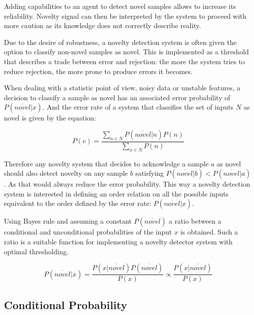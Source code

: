 \documentclass[runningheads,a4paper]{llncs}
\begin{document}
Adding capabilities to an agent to detect novel samples allows to increase its
reliability. Novelty signal can then be interpreted by the system to proceed
with more caution as its knowledge does not correctly describe reality.

Due to the desire of robustness, a novelty detection system is often given the option
to classify non-novel samples as novel. This is implemented as a threshold that describes a trade
between error and rejection: the more the system tries to reduce rejection, the more
prone to produce errors it becomes.

When dealing with a statistic point of view, noisy data or unstable features, a decision to
classify a sample as novel has an associated error probability of $P(\overline{novel}|x)$.
And the error rate of a system that classifies the set of inputs $N$ as novel is given by
the equation:

\begin{equation}
P(e) = \frac{\sum_{n \in N}{P(\overline{novel}|n)P(n)}}{\sum_{n \in N}{P(n)}}
\end{equation}

Therefore any novelty system that decides to acknowledge a sample
$a$ as novel should also detect novelty on any sample $b$ satisfying
$P(\overline{novel}|b) < P(\overline{novel}|a)$.
As that would always reduce the error probability.
This way a novelty detection system is interested in defining an
order relation on all the possible inputs equivalent to the order defined by
the error rate: $P(\overline{novel}|x)$.

Using Bayes rule and assuming a constant $P(\overline{novel})$
a ratio between a conditional and unconditional probabilities of the input $x$ is obtained.
Such a ratio is a suitable function for implementing a novelty detector system with optimal
thresholding.

\begin{equation}
\label{eq:novelty-threshold}
          P(\overline{novel}|x)
  =       \frac{P(x|\overline{novel}) P(\overline{novel})}{P(x)}
  \propto \frac{P(x|\overline{novel})}{P(x)}
\end{equation}

\subsection{Conditional Probability}
\label{sec:conditional-prob}
\end{document}
